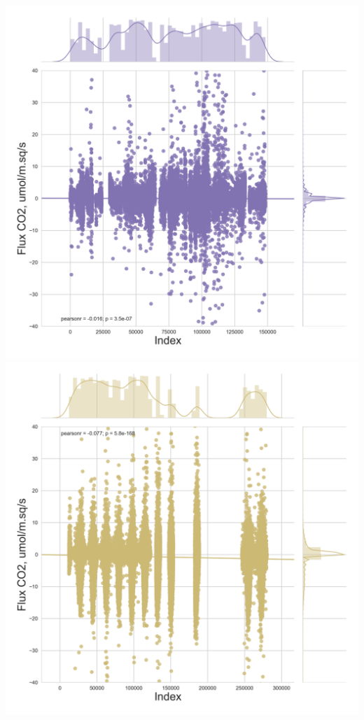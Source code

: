\documentclass{beamer}
\begin{document}
\begin{frame}
\begin{columns}[t]
\centering
\includegraphics[width=\textwidth]{FvsTimeDen/US-FPe.png}\\
\includegraphics[width=\textwidth]{FvsTimeDen/US-Los.png}
\end{columns}

\end{frame}
\end{document}
